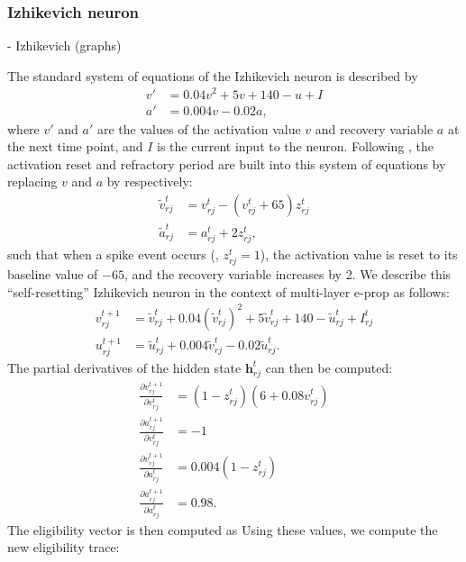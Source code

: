 		\subsubsection{Izhikevich neuron}
			\begin{tcolorbox}[colback=orange]
			- Izhikevich (graphs)
			\end{tcolorbox}

			The standard system of equations of the Izhikevich neuron is described by
			\begin{align}
			v' &= 0.04v^2 + 5v + 140 - u + I\\
			a' &= 0.004v - 0.02a,
			\end{align}
			where $v'$ and $a'$ are the values of the activation value $v$ and recovery variable $a$ at the next time point, and $I$ is the current input to the neuron.
			Following \cite{traub2020learning}, the activation reset and refractory period are built into this system of equations by replacing $v$ and $a$ by respectively:
			\begin{align}
			\tilde{v}^t_{rj} &= v^t_{rj} - \left(v^t_{rj} + 65\right)z^t_{rj}\\
			\tilde{a}^t_{rj} &= a^t_{rj} + 2z^t_{rj},
			\end{align}
			such that when a spike event occurs (\ie, $z^t_{rj} = 1$), the activation value is reset to its baseline value of $-65$, and the recovery variable increases by 2.
			We describe this ``self-resetting'' Izhikevich neuron in the context of multi-layer e-prop as follows:
			\begin{align}
			v^{t+1}_{rj} &= \tilde{v}^t_{rj} + 0.04\left(\tilde{v}^t_{rj}\right)^2 + 5\tilde{v}^t_{rj} + 140 - \tilde{u}^t_{rj} + I^t_{rj}\\
			u^{t+1}_{rj} &= \tilde{u}^t_{rj} + 0.004\tilde{v}^t_{rj}-0.02\tilde{u}^t_{rj}.
			\end{align}
			The partial derivatives of the hidden state $\mathbf{h}^t_{rj}$ can then be computed:
			\begin{align}
			\frac{\partial v^{t+1}_{rj}}{\partial v^t_{rj}} &= \left(1-z^t_{rj}\right)\left(6+0.08v^t_{rj}\right)\\
			\frac{\partial a^{t+1}_{rj}}{\partial v^t_{rj}} &= -1\\
			\frac{\partial v^{t+1}_{rj}}{\partial a^t_{rj}} &= 0.004\left(1-z^t_{rj}\right)\\
			\frac{\partial a^{t+1}_{rj}}{\partial a^t_{rj}} &= 0.98.
			\end{align}
			The eligibility vector is then computed as
			Using these values, we compute the new eligibility trace:
